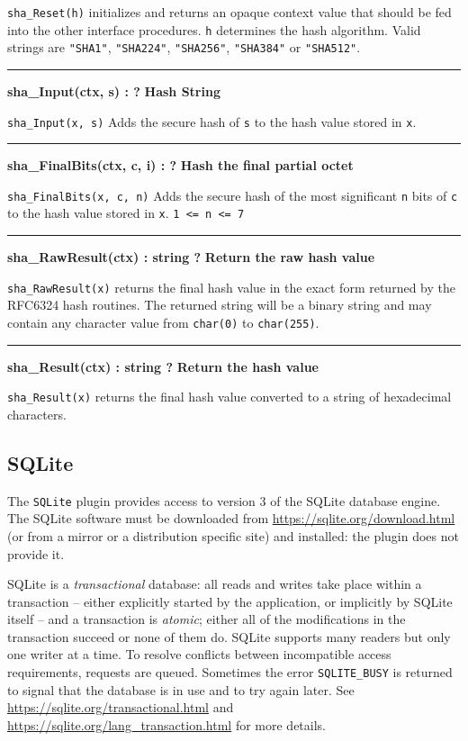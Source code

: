 \noindent
{}
\texttt{sha\_Reset(h)} initializes and returns an opaque context value that
should be fed into the other interface procedures. \texttt{h} determines the
hash algorithm. Valid strings are \texttt{"SHA1"}, \texttt{"SHA224"},
\texttt{"SHA256"}, \texttt{"SHA384"} or \texttt{"SHA512"}.

\bigskip\hrule\vspace{0.1cm}
\noindent
{\bf sha\_Input(ctx, s) : ? } \hfill {\bf Hash String}

\noindent
{}
\texttt{sha\_Input(x, s)} Adds the secure hash of \texttt{s} to the hash value
stored in \texttt{x}.

\bigskip\hrule\vspace{0.1cm}
\noindent
{\bf sha\_FinalBits(ctx, c, i) : ? } \hfill {\bf Hash the final partial octet}

\noindent
{}
\texttt{sha\_FinalBits(x, c, n)} Adds the secure hash of the most significant
\texttt{n} bits of \texttt{c} to the hash value stored in \texttt{x}.
\verb|1 <= n <= 7|

\bigskip\hrule\vspace{0.1cm}
\noindent
{\bf sha\_RawResult(ctx) : string ? } \hfill {\bf Return the raw hash value}

\noindent
{}
\texttt{sha\_RawResult(x)} returns the final hash value in the exact form
returned by the RFC6324 hash routines. The returned string will be a binary
string and may contain any character value from \texttt{char(0)} to
\texttt{char(255)}.

\bigskip\hrule\vspace{0.1cm}
\noindent
{\bf sha\_Result(ctx) : string ? } \hfill {\bf Return the hash value}

\noindent
{}
\texttt{sha\_Result(x)} returns the final hash value converted to a string of
hexadecimal characters.

\subsection{SQLite}
The \texttt{SQLite} plugin provides access to version 3 of the SQLite database
engine. The SQLite software must be downloaded from
\url{https://sqlite.org/download.html} (or from a mirror or a distribution specific
site) and installed: the plugin does not provide it.

SQLite is a {\em transactional\/} database: all reads and writes take place
within a transaction -- either explicitly started by the application, or
implicitly by SQLite itself -- and a transaction is {\em atomic\/}; either all
of the modifications in the transaction succeed or none of them do.  SQLite
supports many readers but only one writer at a time. To resolve conflicts
between incompatible access requirements, requests are queued. Sometimes the
error \texttt{SQLITE\_BUSY} is returned to signal that the database is in use
and to try again later.  See \url{https://sqlite.org/transactional.html} and
\url{https://sqlite.org/lang_transaction.html} for more details.

